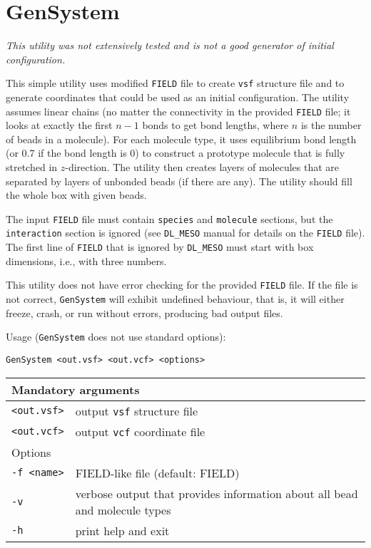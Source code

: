 \section{GenSystem} \label{sec:GenSystem}

\textit{This utility was not extensively tested and is not a good generator
of initial configuration.}

This simple utility uses modified \texttt{FIELD} file to create
\texttt{vsf} structure file and to generate coordinates that could be used
as an initial configuration. The utility assumes linear chains (no matter
the connectivity in the provided \texttt{FIELD} file; it looks at exactly
the first $n-1$ bonds to get bond lengths, where $n$ is the number of beads
in a molecule). For each molecule type, it uses equilibrium bond length (or
0.7 if the bond length is 0) to construct a prototype molecule that is
fully stretched in $z$-direction. The utility then creates layers of
molecules that are separated by layers of unbonded beads (if there are
any). The utility should fill the whole box with given beads.

The input \texttt{FIELD} file must contain \texttt{species} and
\texttt{molecule} sections, but the \texttt{interaction} section is ignored
(see \texttt{DL\_MESO} manual for details on the \texttt{FIELD} file). The
first line of \texttt{FIELD} that is ignored by \texttt{DL\_MESO} must
start with box dimensions, i.e., with three numbers.

This utility does not have error checking for the provided \texttt{FIELD}
file. If the file is not correct, \texttt{GenSystem} will exhibit
undefined behaviour, that is, it will either freeze, crash, or run without
errors, producing bad output files.

Usage (\texttt{GenSystem} does not use standard options):

\vspace{1em}
\noindent
\texttt{GenSystem <out.vsf> <out.vcf> <options>}

\noindent
\begin{longtable}{p{}p{}}
  \toprule
  \multicolumn{2}{l}{Mandatory arguments} \\
  \midrule
  \texttt{<out.vsf>} & output \texttt{vsf} structure file \\
  \texttt{<out.vcf>} & output \texttt{vcf} coordinate file \\
  \toprule
  \multicolumn{2}{l}{Options} \\
  \midrule
  \texttt{-f <name>} & FIELD-like file (default: FIELD)\\
  \texttt{-v}        & verbose output that provides information about all
    bead and molecule types \\
  \texttt{-h}        & print help and exit \\
  \bottomrule
\end{longtable}
